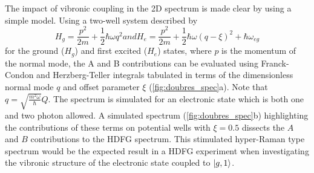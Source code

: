 \documentclass[aip, jcp, reprint, twocolumn]{revtex4-2}
\begin{document}
The impact of vibronic coupling in the 2D spectrum is made clear by using a simple model. \cite{Kundu2022}
Using a two-well system described by 
\begin{subequations}
	\begin{equation}
		H_g = \frac{p^2}{2m} + \frac{1}{2} \hbar \omega q^2
	\end{equation}
and
	\begin{equation}
		H_e = \frac{p^2}{2m} + \frac{1}{2} \hbar \omega (q-\xi)^2 +\hbar \omega_{eg}
	\end{equation}
\end{subequations}
for the ground ($H_g$) and first excited ($H_e$) states, where $p$ is the momentum of the normal mode, the A and B contributions can be evaluated using Franck-Condon and Herzberg-Teller integrals tabulated in terms of the dimensionless normal mode $q$ and offset parameter $\xi$ (\autoref{fig:doubres_spec}a). \cite{Carlson1988thesis} 
Note that $q = \sqrt{\frac{m^2\omega}{\hbar}} Q$.
The spectrum is simulated for an electronic state which is both one and two photon allowed.
A simulated spectrum (\autoref{fig:doubres_spec}b) highlighting the contributions of these terms on potential wells with $\xi = 0.5$ dissects the $A$ and $B$ contributions to the HDFG spectrum.
This stimulated hyper-Raman type spectrum would be the expected result in a HDFG experiment when investigating the vibronic structure of the electronic state coupled to $\ket{g,1}$.
\end{document}
